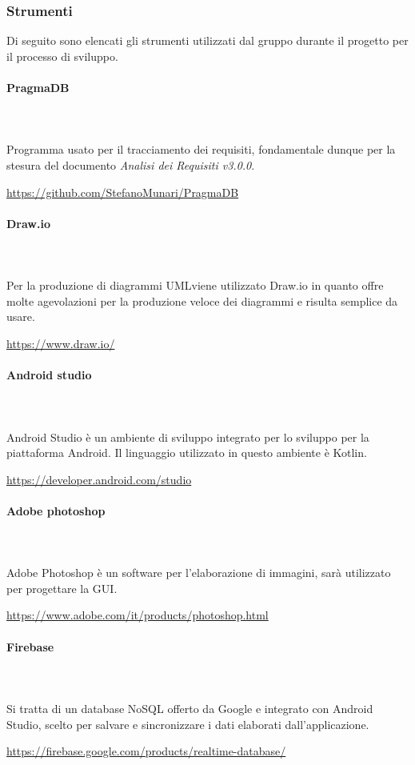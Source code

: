 	\subsubsection{Strumenti}
	Di seguito sono elencati gli strumenti utilizzati dal gruppo durante il progetto per il processo di sviluppo.	
		\paragraph{PragmaDB} \mbox{}\\ \mbox{}\\
		Programma usato per il tracciamento dei requisiti, fondamentale dunque per la stesura del documento \textit{Analisi dei Requisiti v3.0.0}. \newline
		\centerline{\url{https://github.com/StefanoMunari/PragmaDB}}
		\paragraph{Draw.io} \mbox{}\\ \mbox{}\\
		Per la produzione di diagrammi UML\glosp viene utilizzato Draw.io in quanto offre molte agevolazioni per la produzione veloce dei diagrammi e risulta semplice da usare. \newline
		\centerline{\url{https://www.draw.io/}}
		\paragraph{Android studio} \mbox{}\\ \mbox{}\\
		Android Studio è un ambiente di sviluppo integrato per lo sviluppo per la piattaforma Android\glo. Il linguaggio utilizzato in questo ambiente è Kotlin\glo.
		 \newline
		\centerline{\url{https://developer.android.com/studio}}
		\paragraph{Adobe photoshop} \mbox{}\\ \mbox{}\\
		Adobe Photoshop è un software per l'elaborazione di immagini, sarà utilizzato per progettare la GUI\glo.
		\newline
		\centerline{\url{https://www.adobe.com/it/products/photoshop.html}}
		\paragraph{Firebase} \mbox{}\\ \mbox{}\\
		Si tratta di un database NoSQL offerto da Google e integrato con Android Studio, scelto per salvare e sincronizzare i dati elaborati dall'applicazione.
		\newline
		\centerline{\url{https://firebase.google.com/products/realtime-database/}}
